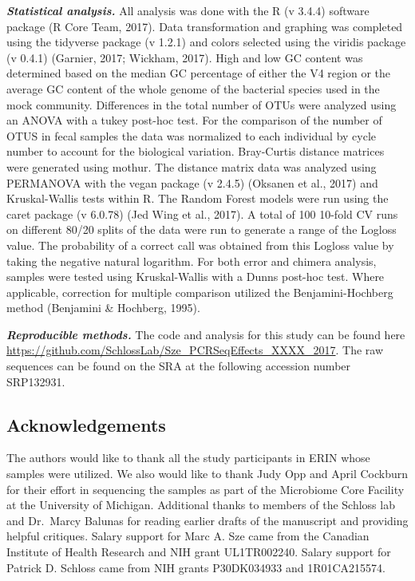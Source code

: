 \documentclass[11pt,]{article}
\begin{document}
\textbf{\emph{Statistical analysis.}} All analysis was done with the R
(v 3.4.4) software package (R Core Team, 2017). Data transformation and
graphing was completed using the tidyverse package (v 1.2.1) and colors
selected using the viridis package (v 0.4.1) (Garnier, 2017; Wickham,
2017). High and low GC content was determined based on the median GC
percentage of either the V4 region or the average GC content of the
whole genome of the bacterial species used in the mock community.
Differences in the total number of OTUs were analyzed using an ANOVA
with a tukey post-hoc test. For the comparison of the number of OTUS in
fecal samples the data was normalized to each individual by cycle number
to account for the biological variation. Bray-Curtis distance matrices
were generated using mothur. The distance matrix data was analyzed using
PERMANOVA with the vegan package (v 2.4.5) (Oksanen et al., 2017) and
Kruskal-Wallis tests within R. The Random Forest models were run using
the caret package (v 6.0.78) (Jed Wing et al., 2017). A total of 100
10-fold CV runs on different 80/20 splits of the data were run to
generate a range of the Logloss value. The probability of a correct call
was obtained from this Logloss value by taking the negative natural
logarithm. For both error and chimera analysis, samples were tested
using Kruskal-Wallis with a Dunns post-hoc test. Where applicable,
correction for multiple comparison utilized the Benjamini-Hochberg
method (Benjamini \& Hochberg, 1995).

\textbf{\emph{Reproducible methods.}} The code and analysis for this
study can be found here
\url{https://github.com/SchlossLab/Sze_PCRSeqEffects_XXXX_2017}. The raw
sequences can be found on the SRA at the following accession number
SRP132931.

\newpage

\subsection{Acknowledgements}\label{acknowledgements}

The authors would like to thank all the study participants in ERIN whose
samples were utilized. We also would like to thank Judy Opp and April
Cockburn for their effort in sequencing the samples as part of the
Microbiome Core Facility at the University of Michigan. Additional
thanks to members of the Schloss lab and Dr.~Marcy Balunas for reading
earlier drafts of the manuscript and providing helpful critiques. Salary
support for Marc A. Sze came from the Canadian Institute of Health
Research and NIH grant UL1TR002240. Salary support for Patrick D.
Schloss came from NIH grants P30DK034933 and 1R01CA215574.
\end{document}
